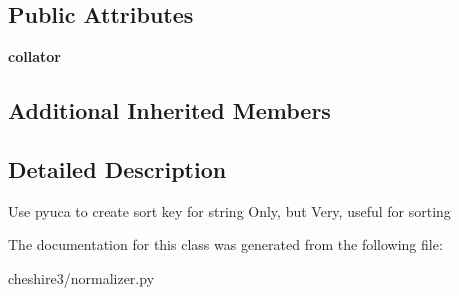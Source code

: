 \subsection*{Public Attributes}
\begin{DoxyCompactItemize}
\item 
\hypertarget{classcheshire3_1_1normalizer_1_1_unicode_collation_normalizer_abc51d407c24facc2dd2c1609c4c59372}{{\bfseries collator}}\label{classcheshire3_1_1normalizer_1_1_unicode_collation_normalizer_abc51d407c24facc2dd2c1609c4c59372}

\end{DoxyCompactItemize}
\subsection*{Additional Inherited Members}


\subsection{Detailed Description}
\begin{DoxyVerb}Use pyuca to create sort key for string
    Only, but Very, useful for sorting
\end{DoxyVerb}
 

The documentation for this class was generated from the following file\-:\begin{DoxyCompactItemize}
\item 
cheshire3/normalizer.\-py\end{DoxyCompactItemize}
